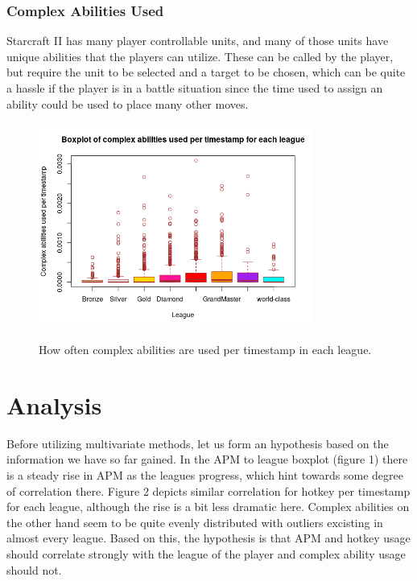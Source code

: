 \documentclass{article}
\begin{document}
\subsubsection{Complex Abilities Used}
Starcraft II has many player controllable units, and many of those units have unique abilities that the players can utilize. These can be called by the player, but require the unit to be selected and a target to be chosen, which can be quite a hassle if the player is in a battle situation since the time used to assign an ability could be used to place many other moves.

\begin{figure} [H]
    \centering
    \includegraphics[width=0.8\textwidth]{abilities_boxplot.png}
    \label{figure:figure:abilities-boxplot}
    \caption{How often complex abilities are used per timestamp in each league.}
\end{figure}

\section{Analysis}
Before utilizing multivariate methods, let us form an hypothesis based on the information we have so far gained. In the APM to league boxplot (figure 1) there is a steady rise in APM as the leagues progress, which hint towards some degree of correlation there. Figure 2 depicts similar correlation for hotkey per timestamp for each league, although the rise is a bit less dramatic here. Complex abilities on the other hand seem to be quite evenly distributed with outliers excisting in almost every league. Based on this, the hypothesis is that APM and hotkey usage should correlate strongly with the league of the player and complex ability usage should not.
\end{document}
